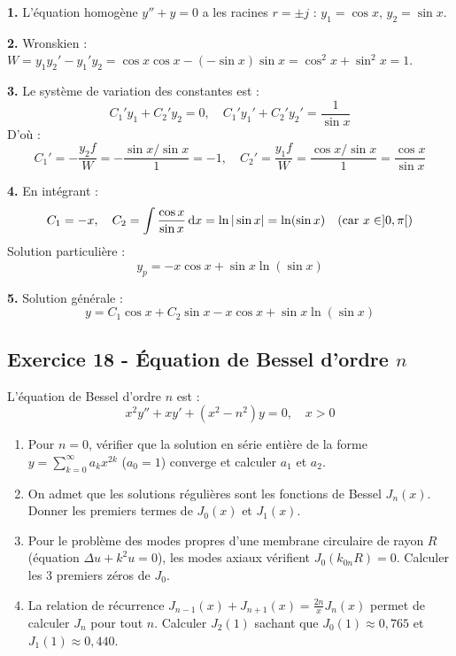 \documentclass[12pt,a4paper]{article}
\begin{document}
\begin{boitecorrige}
\textbf{1.} L'équation homogène $y''+y=0$ a les racines $r=\pm j$ : $y_1 = \cos x$, $y_2 = \sin x$.

\textbf{2.} Wronskien : $W = y_1 y_2' - y_1' y_2 = \cos x\cos x - (-\sin x)\sin x = \cos^2 x + \sin^2 x = 1$.

\textbf{3.} Le système de variation des constantes est :
\[
C_1' y_1 + C_2' y_2 = 0, \quad C_1' y_1' + C_2' y_2' = \frac{1}{\sin x}
\]
D'où :
\[
C_1' = -\frac{y_2 f}{W} = -\frac{\sin x/\sin x}{1} = -1, \quad C_2' = \frac{y_1 f}{W} = \frac{\cos x/\sin x}{1} = \frac{\cos x}{\sin x}
\]

\textbf{4.} En intégrant :
\[
C_1 = -x, \quad C_2 = \int\frac{\cos x}{\sin x}\,\mathrm{d} x = \ln|\sin x| = \ln(\sin x) \quad\text{(car $x\in]0,\pi[$)}
\]
Solution particulière :
\[
y_p = -x\cos x + \sin x\ln(\sin x)
\]

\textbf{5.} Solution générale :
\[
\boxed{y = C_1\cos x + C_2\sin x - x\cos x + \sin x\ln(\sin x)}
\]
\end{boitecorrige}

\subsection*{Exercice 18 - Équation de Bessel d'ordre $n$ \niveau{\difficile}}

\begin{boiteexercice}
L'équation de Bessel d'ordre $n$ est :
\[
x^2 y'' + xy' + (x^2 - n^2)y = 0, \quad x > 0
\]
\begin{enumerate}
  \item Pour $n=0$, vérifier que la solution en série entière de la forme $y = \sum_{k=0}^\infty a_k x^{2k}$ ($a_0=1$) converge et calculer $a_1$ et $a_2$.
  \item On admet que les solutions régulières sont les fonctions de Bessel $J_n(x)$. Donner les premiers termes de $J_0(x)$ et $J_1(x)$.
  \item Pour le problème des modes propres d'une membrane circulaire de rayon $R$ (équation $\Delta u + k^2 u = 0$), les modes axiaux vérifient $J_0(k_{0n}R) = 0$. Calculer les 3 premiers zéros de $J_0$.
  \item La relation de récurrence $J_{n-1}(x)+J_{n+1}(x) = \frac{2n}{x}J_n(x)$ permet de calculer $J_n$ pour tout $n$. Calculer $J_2(1)$ sachant que $J_0(1)\approx0{,}765$ et $J_1(1)\approx0{,}440$.
\end{enumerate}
\end{boiteexercice}
\end{document}
